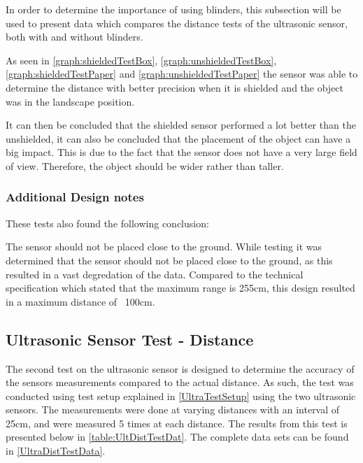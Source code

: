 In order to determine the importance of using blinders, this subsection will be
used to present data which compares the distance tests of the ultrasonic sensor,
both with and without blinders.






As seen in \autoref{graph:shieldedTestBox}, \autoref{graph:unshieldedTestBox},
\autoref{graph:shieldedTestPaper} and \autoref{graph:unshieldedTestPaper} the
sensor was able to determine the distance with better precision when it is
shielded and the object was in the landscape position. \nl

It can then be concluded that the shielded sensor performed a lot better than
the unshielded, it can also be concluded that the placement of the object can
have a big impact. This is due to the fact that the sensor does not have a very
large field of view. Therefore, the object should be wider rather than taller.

\subsubsection{Additional Design notes}
These tests also found the following conclusion:\nl

The sensor should not be placed close to the ground. While testing it was
determined that the sensor should not be placed close to the ground, as this
resulted in a vast degredation of the data. Compared to the technical
specification which stated that the maximum range is 255cm, this design resulted
in a maximum distance of ~100cm.\nl

\subsection{Ultrasonic Sensor Test - Distance}
The second test on the ultrasonic sensor is designed to determine the accuracy
of the sensors measurements compared to the actual distance. As such, the test
was conducted using test setup explained in \autoref{UltraTestSetup} using the
two ultrasonic sensors. The measurements were done at varying distances with an
interval of 25cm, and were measured 5 times at each distance. The results from
this test is presented below in \autoref{table:UltDistTestDat}. The complete
data sets can be found in \autoref{UltraDistTestData}.

